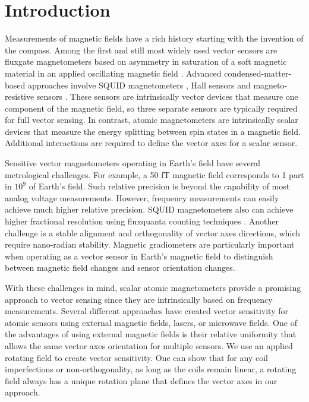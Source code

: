 \documentclass[prx,twocolumn,10pt,nofootinbib]{revtex4-1}
\begin{document}
\section{Introduction}
Measurements of magnetic ﬁelds have a rich history starting with the invention of the compass. Among the ﬁrst and still most widely used vector sensors are ﬂuxgate magnetometers based on asymmetry in saturation of a soft magnetic material in an applied oscillating magnetic ﬁeld \cite{koch2001low}. Advanced condensed-matter-based approaches involve SQUID magnetometers \cite{storm2017ultra}, Hall sensors \cite{nhalil2019planar} and magneto-resistive sensors \cite{li2012magneto}. These sensors are intrinsically vector devices that measure one component of the magnetic ﬁeld, so three separate sensors are typically required for full vector sensing. In contrast, atomic magnetometers are intrinsically scalar devices that measure the energy splitting between spin states in a magnetic ﬁeld. Additional interactions are required to deﬁne the vector axes for a scalar sensor.

Sensitive vector magnetometers operating in Earth’s ﬁeld have several metrological challenges. For example, a 50 fT magnetic ﬁeld corresponds to 1 part in $10^9$ of Earth’s ﬁeld. Such relative precision is beyond the capability of most analog voltage measurements. However, frequency measurements can easily achieve much higher relative precision. SQUID magnetometers also can achieve higher fractional resolution using ﬂuxquanta counting techniques \cite{storm2017ultra}. Another challenge is a stable alignment and orthogonality of vector axes directions, which require nano-radian stability. Magnetic gradiometers are particularly important when operating as a vector sensor in Earth’s magnetic ﬁeld to distinguish between magnetic ﬁeld changes and sensor orientation changes.

With these challenges in mind, scalar atomic magnetometers provide a promising approach to vector sensing since they are intrinsically based on frequency measurements. Several diﬀerent approaches have created vector sensitivity for atomic sensors using external magnetic ﬁelds, lasers, or microwave ﬁelds. One of the advantages of using external magnetic ﬁelds is their relative uniformity that allows the same vector axes orientation for multiple sensors. We use an applied rotating ﬁeld to create vector sensitivity. One can show that for any coil imperfections or non-orthogonality, as long as the coils remain linear, a rotating ﬁeld always has a unique rotation plane that deﬁnes the vector axes in our approach.
\end{document}
